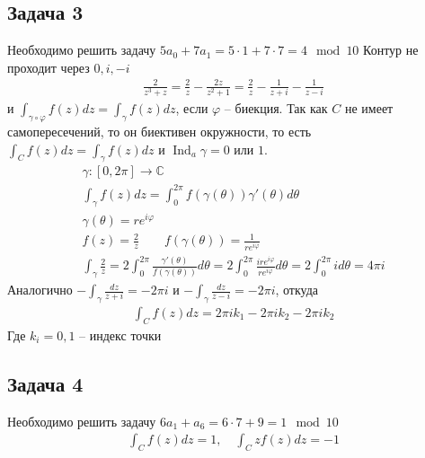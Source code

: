 \subsection*{Задача 3}
	Необходимо решить задачу $5a_0 + 7a_1 = 5 \cdot 1 + 7 \cdot 7 = 4 \mod 10$
	Контур не проходит через $0,i,-i$
	\begin{gather*}
		\frac{2}{z^3 + z} = \frac{2}{z} - \frac{2z}{z^2+1} = \frac{2}{z} - \frac{1}{z + i} - \frac{1}{z - i}
	\end{gather*}
	и $\int_{\gamma \circ \varphi} f(z)dz = \int_{\gamma} f(z)dz$, если $\varphi$ -- биекция. Так как $C$ не имеет самопересечений, то он биективен окружности, то есть $\int_{C} f(z)dz = \int_{\gamma} f(z)dz$ и $\operatorname{Ind}_a \gamma = 0$ или $1$.
	\begin{gather*}
		\gamma: [0,2\pi] \to \mathbb{C}\\
		\int_{\gamma} f(z)dz = \int_{0}^{2\pi} f(\gamma(\theta)) \gamma'(\theta) d\theta\\
		\gamma(\theta) = r e^{i \varphi}\\
		f(z) = \frac{2}{z}\qquad f(\gamma(\theta)) = \frac{1}{re^{i \varphi}}\\
		\int_{\gamma} \frac{2}{z}
		= 2\int_{0}^{2\pi} \frac{\gamma'(\theta)}{f(\gamma(\theta))} d\theta
		= 2\int_{0}^{2\pi} \frac{ire^{i \varphi}}{r e^{i \varphi}} d \theta
		= 2\int_{0}^{2\pi} i d\theta = 4\pi i
	\end{gather*}
	Аналогично $-\int_{\gamma} \frac{dz}{z + i} = -	2\pi i$ и $-\int_{\gamma} \frac{dz}{z - i} = -	2\pi i$, откуда
	\begin{gather*}
		\int_{C} f(z)dz = 2\pi i k_1 - 2 \pi i k_2 - 2\pi i k_2
	\end{gather*}
	Где $k_i = 0,1$ -- индекс точки
\vskip 0.4in

\subsection*{Задача 4}
	Необходимо решить задачу $6a_1 + a_6 = 6 \cdot 7 + 9 = 1 \mod 10$
	\begin{gather*}
		\int_C f(z)dz = 1,\quad \int_{C}zf(z)dz = -1
	\end{gather*}
\vskip 0.4in
